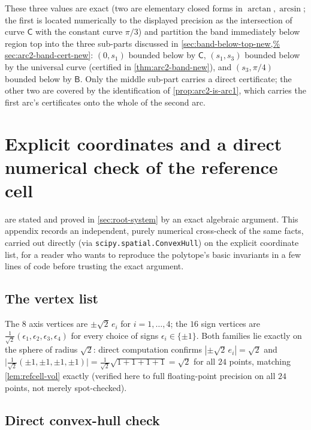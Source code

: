\documentclass[11pt,reqno]{amsart}
\renewcommand{\_}{\origunderscore\allowbreak}
\numberwithin{equation}{section}
\theoremstyle{plain}
\theoremstyle{definition}
\theoremstyle{remark}
\newcommand{\arcp}{s}                        %
\begin{document}
These three values are exact (two are elementary closed forms in
$\arctan,\arcsin$; the first is located numerically to the displayed
precision as the intersection of curve $\mathsf C$ with the constant
curve $\pi/3$) and partition the band immediately below region top
into the three sub-parts discussed in \cref{sec:band-below-top-new,%
sec:arc2-band-cert-new}: $(0,\arcp_1)$ bounded below by $\mathsf C$,
$(\arcp_1,\arcp_3)$ bounded below by the universal curve (certified in
\cref{thm:arc2-band-new}), and $(\arcp_3,\pi/4)$ bounded below by
$\mathsf B$. Only the middle sub-part carries a direct certificate; the
other two are covered by the identification of \cref{prop:arc2-is-arc1},
which carries the first arc's certificates onto the whole of the second
arc.
\section{Explicit coordinates and a direct numerical check of the reference cell}\label{app:explicit-vertices}

 are stated and proved in
\cref{sec:root-system} by an exact algebraic argument. This appendix
records an independent, purely numerical cross-check of the same
facts, carried out directly (via \texttt{scipy.spatial.ConvexHull}) on
the explicit coordinate list, for a reader who wants to reproduce the
polytope's basic invariants in a few lines of code before trusting the
exact argument.

\subsection*{The vertex list}

The $8$ axis vertices are $\pm\sqrt2\,e_i$ for $i=1,\dots,4$; the $16$
sign vertices are $\tfrac1{\sqrt2}(\epsilon_1,\epsilon_2,\epsilon_3,\epsilon_4)$
for every choice of signs $\epsilon_i\in\{\pm1\}$. Both families lie
exactly on the sphere of radius $\sqrt2$: direct computation confirms
$|\pm\sqrt2\,e_i|=\sqrt2$ and $\bigl|\tfrac1{\sqrt2}(\pm1,\pm1,\pm1,\pm1)\bigr|
=\tfrac1{\sqrt2}\sqrt{1+1+1+1}=\sqrt2$ for all $24$ points, matching
\cref{lem:refcell-vol} exactly (verified here to full floating-point
precision on all $24$ points, not merely spot-checked).

\subsection*{Direct convex-hull check}
\end{document}
